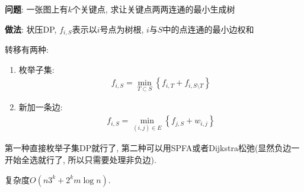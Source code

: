 {\bfseries 问题}: 一张图上有$k$个关键点, 求让关键点两两连通的最小生成树

{\bfseries 做法}: 状压DP, $f_{i,S}$表示以$i$号点为树根, $i$与$S$中的点连通的最小边权和

转移有两种:
\begin{enumerate}
	\item 枚举子集: $$\begin{aligned}f_{i, S} = \min_{T\subset S} \left\{f_{i, T} + f_{i, S\setminus T}\right\}\end{aligned}$$
	\item 新加一条边: $$\begin{aligned}f_{i, S} = \min_{(i, j)\in E} \left\{f_{j, S} + w_{i, j}\right\}\end{aligned}$$
\end{enumerate}
第一种直接枚举子集DP就行了, 第二种可以用SPFA或者Dijkstra松弛(显然负边一开始全选就行了, 所以只需要处理非负边).

复杂度$O(n 3^k + 2^k m\log n)$.